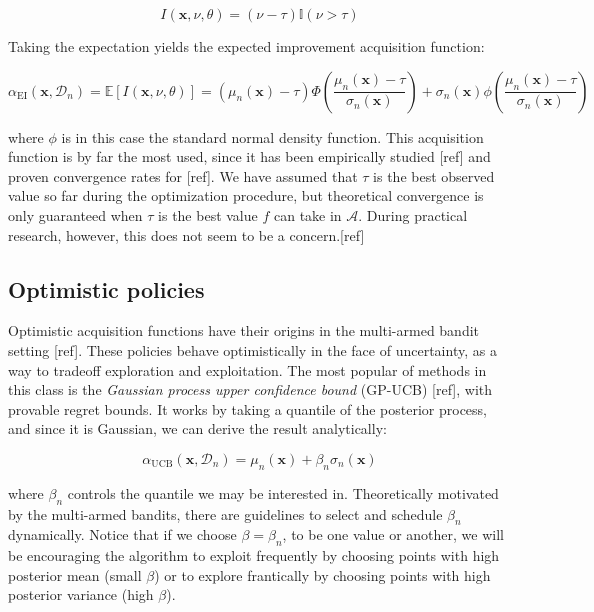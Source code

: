 \documentclass[10pt,a4paper,twoside]{book}
\begin{document}
\begin{equation}
I(\boldsymbol{x}, \nu, \theta) = (\nu - \tau)\mathbb{I}(\nu > \tau)
\end{equation}

Taking the expectation yields the expected improvement acquisition function:

\begin{equation}
\alpha_{\mathrm{EI}}(\boldsymbol{x}, \mathcal{D}_n) = \mathbb{E}\left[I(\boldsymbol{x}, \nu, \theta)\right] = (\mu_n(\boldsymbol{x}) - \tau)\Phi\left(\dfrac{\mu_n(\boldsymbol{x}) - \tau}{\sigma_n(\boldsymbol{x})}  \right) + \sigma_n(\boldsymbol{x})\phi\left( \dfrac{\mu_n(\boldsymbol{x}) - \tau}{\sigma_n(\boldsymbol{x})} \right)
\end{equation}

where $\phi$ is in this case the standard normal density function. This acquisition function is by far the most used, since it has been empirically studied [ref] and proven convergence rates for [ref]. We have assumed that $\tau$ is the best observed value so far during the optimization procedure, but theoretical convergence is only guaranteed when $\tau$ is the best value $f$ can take in $\mathcal{A}$. During practical research, however, this does not seem to be a concern.[ref] 

\subsection{Optimistic policies}

Optimistic acquisition functions have their origins in the multi-armed bandit setting [ref]. These policies behave optimistically in the face of uncertainty, as a way to tradeoff exploration and exploitation. The most popular of methods in this class is the \textit{Gaussian process upper confidence bound} (GP-UCB) [ref], with provable regret bounds. It works by taking a quantile of the posterior process, and since it is Gaussian, we can derive the result analytically:

\begin{equation}
\alpha_{\mathrm{UCB}}(\boldsymbol{x}, \mathcal{D}_n) = \mu_n(\boldsymbol{x}) + \beta_n\sigma_n(\boldsymbol{x})
\end{equation}

where $\beta_n$ controls the quantile we may be interested in. Theoretically motivated by the multi-armed bandits, there are guidelines to select and schedule $\beta_n$ dynamically. Notice that if we choose $\beta = \beta_n$, to be one value or another, we will be encouraging the algorithm to exploit frequently by choosing points with high posterior mean (small $\beta$) or to explore frantically by choosing points with high posterior variance (high $\beta$).
\end{document}
